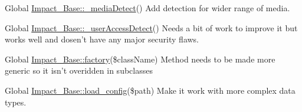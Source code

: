 \begin{DoxyDescription}
\item[Global \hyperlink{classImpact__Base_a36245233fa9d0fbb0a71e2a985e79c72}{Impact\_\-Base::\_\-mediaDetect}() ]Add detection for wider range of media. 
\end{DoxyDescription}

\label{todo__todo000005}
\hypertarget{todo__todo000005}{}
 
\begin{DoxyDescription}
\item[Global \hyperlink{classImpact__Base_a6e7a5edea355b304f86d731e4d57dc84}{Impact\_\-Base::\_\-userAccessDetect}() ]Needs a bit of work to improve it but works well and dosen't have any major security flaws. 
\end{DoxyDescription}

\label{todo__todo000001}
\hypertarget{todo__todo000001}{}
 
\begin{DoxyDescription}
\item[Global \hyperlink{classImpact__Base_a8c0508f1ea0fe72c8d0e6e8dd2a1c41c}{Impact\_\-Base::factory}(\$className) ]Method needs to be made more generic so it isn't overidden in subclasses 
\end{DoxyDescription}

\label{todo__todo000008}
\hypertarget{todo__todo000008}{}
 
\begin{DoxyDescription}
\item[Global \hyperlink{classImpact__Base_aa0142dba3a229260d22d37308f9544f7}{Impact\_\-Base::load\_\-config}(\$path) ]Make it work with more complex data types. 
\end{DoxyDescription}
